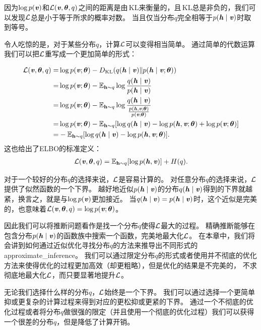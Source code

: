 因为$\log p(\Vv)$和$\CalL(\Vv,{\Vtheta},q)$之间的距离是由\,\gls{KL}来衡量的，且\,\gls{KL}总是非负的，我们可以发现$\CalL$总是小于等于所求的概率对数。
当且仅当分布$q$完全相等于$p(\Vh\mid\Vv)$时取到等号。


令人吃惊的是，对于某些分布$q$，计算$\CalL$可以变得相当简单。
通过简单的代数运算我们可以把$\CalL$重写成一个更加简单的形式：

\begin{align}
\CalL(\Vv,{\Vtheta},q) = & \log p(\Vv;{\Vtheta})- D_{\text{KL}}(q(\Vh\mid\Vv)\Vert p(\Vh\mid\Vv;{\Vtheta})) \\
= & \log p(\Vv;{\Vtheta}) - \SetE_{\RVh\sim q}\log \frac{q(\Vh\mid\Vv)}{p(\Vh\mid\Vv)} \\
= & \log p(\Vv;{\Vtheta}) -  \SetE_{\RVh\sim q} \log \frac{q(\Vh\mid\Vv) }{ \frac{p(\Vh,\Vv;{\Vtheta})}{p(\Vv; {\Vtheta})} } \\
= & \log p(\Vv; {\Vtheta}) -  \SetE_{\RVh\sim q} [\log q(\Vh\mid\Vv) - \log {p(\Vh,\Vv; {\Vtheta})} + \log {p(\Vv; {\Vtheta})} ]\\
= & - \SetE_{\RVh\sim q}[\log q(\Vh\mid\Vv) - \log {p(\Vh,\Vv;{\Vtheta})}].
\end{align}
这也给出了\gls{ELBO}的标准定义：
\begin{align}
\CalL(\Vv,{\Vtheta},q) = \SetE_{\RVh\sim q}[\log p(\Vh , \Vv)] + H(q).
\end{align}


对于一个较好的分布$q$的选择来说，$\CalL$是容易计算的。
对任意分布$q$的选择来说，$\CalL$提供了似然函数的一个下界。
越好地近似$p(\Vh\mid\Vv)$的分布$q(\Vh\mid\Vv)$得到的下界就越紧，换言之，就是与$\log p(\Vv)$更加接近。
当$q(\Vh\mid\Vv) = p(\Vh\mid\Vv)$时，这个近似是完美的，也意味着$\CalL(\Vv,{\Vtheta},q) = \log {p(\Vv;{\Vtheta})} $。


因此我们可以将推断问题看作是找一个分布$q$使得$\CalL$最大的过程。
精确推断能够在包含分布$p(\Vh\mid\Vv)$的函数族中搜索一个函数，完美地最大化$\CalL$。
在本章中，我们将会讲到如何通过近似优化寻找分布$q$的方法来推导出不同形式的\gls{approximate_inference}。
我们可以通过限定分布$q$的形式或者使用并不彻底的优化方法来使得优化的过程更加高效（却更粗略），但是优化的结果是不完美的，
不求彻底地最大化$\CalL$，而只要显著地提升$\CalL$。


无论我们选择什么样的分布$q$，$\CalL$始终是一个下界。
我们可以通过选择一个更简单抑或更复杂的计算过程来得到对应的更松抑或更紧的下界。
通过一个不彻底的优化过程或者将分布$q$做很强的限定（并且使用一个彻底的优化过程）我们可以获得一个很差的分布$q$，但是降低了计算开销。


